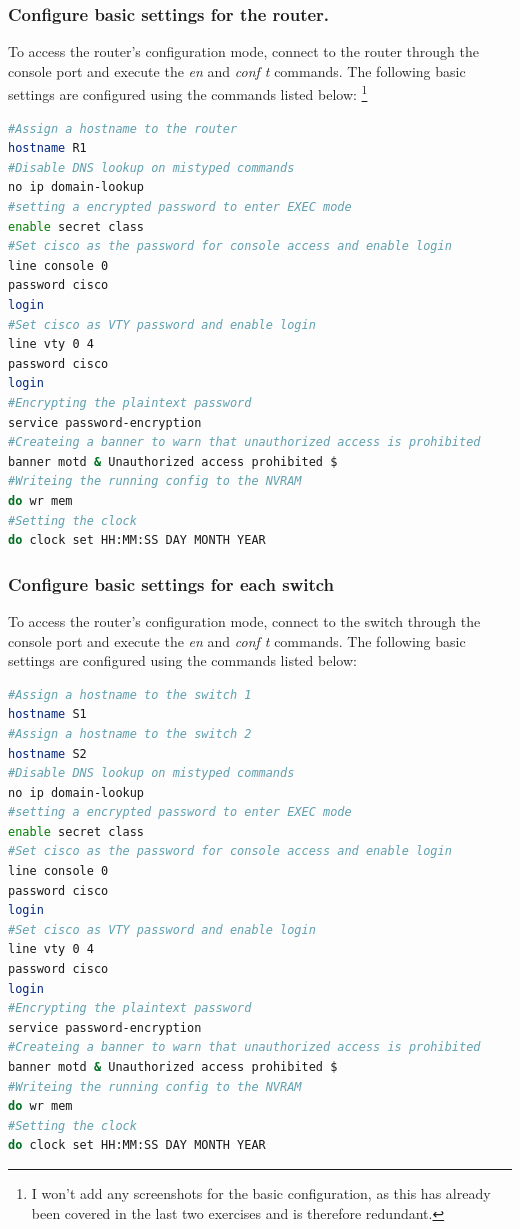 \documentclass[a4paper]{article}
\newcommand{\abc}{\hfill \break}
\newcommand{\ii}{\textit}
\begin{document}
\subsubsection{Configure basic settings for the router.}
To access the router's configuration mode, connect to the router through the console port and execute the \ii{en} and \ii{conf t} commands.\abc
The following basic settings are configured using the commands listed below: \footnote{I won't add any screenshots for the basic configuration, as this has already been covered in the last two exercises and is therefore redundant.}
\begin{lstlisting}[language=bash]
#Assign a hostname to the router
hostname R1
#Disable DNS lookup on mistyped commands
no ip domain-lookup
#setting a encrypted password to enter EXEC mode
enable secret class
#Set cisco as the password for console access and enable login
line console 0
password cisco
login
#Set cisco as VTY password and enable login
line vty 0 4
password cisco
login
#Encrypting the plaintext password
service password-encryption
#Createing a banner to warn that unauthorized access is prohibited
banner motd & Unauthorized access prohibited $
#Writeing the running config to the NVRAM
do wr mem
#Setting the clock
do clock set HH:MM:SS DAY MONTH YEAR
\end{lstlisting}

\subsubsection{Configure basic settings for each switch}
To access the router's configuration mode, connect to the switch through the console port and execute the \ii{en} and \ii{conf t} commands.\abc
The following basic settings are configured using the commands listed below:
\begin{lstlisting}[language=bash]
#Assign a hostname to the switch 1
hostname S1
#Assign a hostname to the switch 2
hostname S2
#Disable DNS lookup on mistyped commands
no ip domain-lookup
#setting a encrypted password to enter EXEC mode
enable secret class
#Set cisco as the password for console access and enable login
line console 0
password cisco
login
#Set cisco as VTY password and enable login
line vty 0 4
password cisco
login
#Encrypting the plaintext password
service password-encryption
#Createing a banner to warn that unauthorized access is prohibited
banner motd & Unauthorized access prohibited $
#Writeing the running config to the NVRAM
do wr mem
#Setting the clock
do clock set HH:MM:SS DAY MONTH YEAR
\end{lstlisting}
\end{document}
